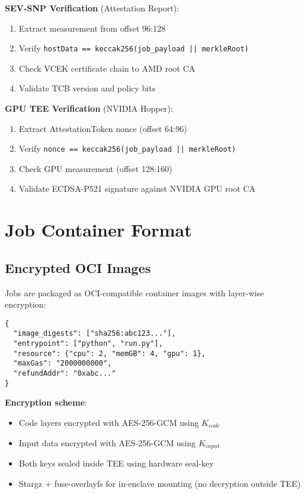 \documentclass[11pt,letterpaper]{article}
\begin{document}
\textbf{SEV-SNP Verification} (Attestation Report):
\begin{enumerate}
  \item Extract measurement from offset 96:128
  \item Verify \texttt{hostData == keccak256(job\_payload || merkleRoot)}
  \item Check VCEK certificate chain to AMD root CA
  \item Validate TCB version and policy bits
\end{enumerate}

\textbf{GPU TEE Verification} (NVIDIA Hopper):
\begin{enumerate}
  \item Extract AttestationToken nonce (offset 64:96)
  \item Verify \texttt{nonce == keccak256(job\_payload || merkleRoot)}
  \item Check GPU measurement (offset 128:160)
  \item Validate ECDSA-P521 signature against NVIDIA GPU root CA
\end{enumerate}

\section{Job Container Format}
\label{sec:containers}

\subsection{Encrypted OCI Images}

Jobs are packaged as OCI-compatible container images with layer-wise encryption:

\begin{lstlisting}[caption={Job Container Manifest},label={lst:container}]
{
  "image_digests": ["sha256:abc123..."],
  "entrypoint": ["python", "run.py"],
  "resource": {"cpu": 2, "memGB": 4, "gpu": 1},
  "maxGas": "2000000000",
  "refundAddr": "0xabc..."
}
\end{lstlisting}

\textbf{Encryption scheme}:
\begin{itemize}
  \item Code layers encrypted with AES-256-GCM using $K_{code}$
  \item Input data encrypted with AES-256-GCM using $K_{input}$
  \item Both keys sealed inside TEE using hardware seal-key
  \item Stargz + fuse-overlayfs for in-enclave mounting (no decryption outside TEE)
\end{itemize}
\end{document}
